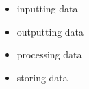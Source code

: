 \begin{itemize}
  \item inputting data
  \item outputting data
  \item processing data
  \item storing data
\end{itemize}
